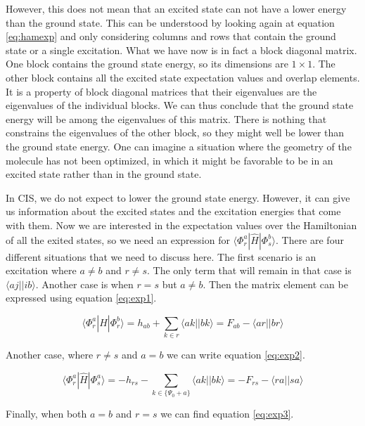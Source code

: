 \documentclass[twoside,twocolumn,9pt]{article}
\begin{document}
However, this does not mean that an excited state can not have a lower energy than the ground state. This can be understood by looking again at equation \eqref{eq:hamexp} and only
considering columns and rows that contain the ground state or a single excitation. What we have now is in fact a block diagonal matrix. One block contains the ground state energy, so
its dimensions are $1\times 1 $. The other block contains all the excited state expectation values and overlap elements. It is a property of block diagonal matrices that their
eigenvalues are the eigenvalues of the individual blocks. We can thus conclude that the ground state energy will be among the eigenvalues of this matrix. There is nothing that
constrains the eigenvalues of the other block, so they might well be lower than the ground state energy. One can imagine a situation where the geometry of the molecule has not been
optimized, in which it might be favorable to be in an excited state rather than in the ground state.

In CIS, we do not expect to lower the ground state energy. However, it can give us information about the
excited states and the excitation energies that come with them. Now we are interested in the expectation values over the Hamiltonian of all the exited states, so we need an expression
for $\langle \Phi_r^a |\hat{H}| \Phi_s^b \rangle$. There are four different situations that we need to discuss here\cite{Sherrill1996}. The first scenario is an excitation where
$a \neq b$ and $r \neq s$. The only term that will remain in that case is $\langle aj || ib \rangle$. Another case is when $r = s$ but $a \neq b$. Then the matrix element can be
expressed using equation \eqref{eq:exp1}.

\begin{equation}\label{eq:exp1}
  \langle \Phi_r^a|\hat{H}|\Phi^b_r \rangle = h_{ab} + \sum_{k\in r} \langle ak || bk \rangle = F_{ab} - \langle ar||br \rangle
\end{equation}

Another case, where $r \neq s$ and $a = b$ we can write equation \eqref{eq:exp2}.

\begin{equation}\label{eq:exp2}
  \langle \Phi_r^a|\hat{H}|\Phi^a_s \rangle = -h_{rs} - \sum_{k \in \{\Psi_0 + a\}} \langle ak || bk \rangle = -F_{rs} - \langle ra || sa \rangle
\end{equation}

Finally, when both $a = b$ and $r = s$ we can find equation \eqref{eq:exp3}.
\end{document}
